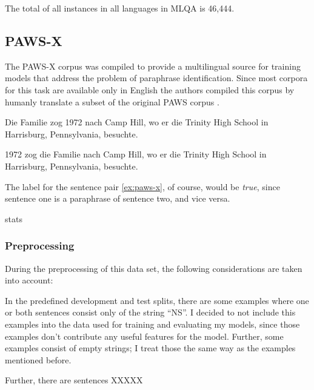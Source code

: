 The total of all instances in all languages in MLQA is 46,444.

\subsection{PAWS-X}

The PAWS-X corpus \cite{yang2019paws} was compiled to provide a multilingual source for training
models that address the problem of paraphrase identification.
Since most corpora for this task are available only in English the authors compiled this corpus by
humanly translate a subset of the original PAWS corpus \cite{zhang2019paws}.

\begin{examples}
  \label{ex:paws-x}
  \item Die Familie zog 1972 nach Camp Hill, wo er die Trinity High School in Harrisburg, Pennsylvania, besuchte.

  1972 zog die Familie nach Camp Hill, wo er die Trinity High School in Harrisburg, Pennsylvania, besuchte.
\end{examples}

The label for the sentence pair \ref{ex:paws-x}, of course, would be \emph{true}, since sentence
one is a paraphrase of sentence two, and vice versa.


stats

\subsubsection{Preprocessing}

During the preprocessing of this data set, the following considerations are taken into account:

In the predefined development and test splits, there are some examples where one or both sentences
consist
only of the string ``NS''.
I decided to not include this examples into the data used for training and evaluating my models,
since
those examples don't contribute any useful features for the model.
Further, some examples consist of empty strings; I treat those the same way as the examples
mentioned before.

Further, there are sentences XXXXX

